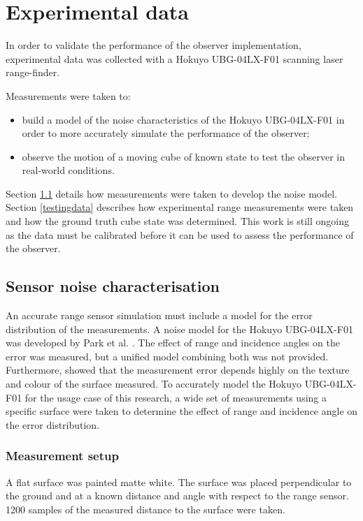 \chapter{Experimental data} \label{chap:experiment}
In order to validate the performance of the observer implementation, experimental data was collected with a Hokuyo UBG-04LX-F01 scanning laser range-finder.

Measurements were taken to:
\begin{itemize}
\item build a model of the noise characteristics of the Hokuyo UBG-04LX-F01 in order to more accurately simulate the performance of the observer;
\item observe the motion of a moving cube of known state to test the observer in real-world conditions.
\end{itemize}

Section \ref{sensor_noise} details how measurements were taken to develop the noise model.
Section \ref{testingdata} describes how experimental range measurements were taken and how the ground truth cube state was determined. This work is still ongoing as the data must be calibrated before it can be used to assess the performance of the observer. 

\section{Sensor noise characterisation} \label{sensor_noise}
An accurate range sensor simulation must include a model for the error distribution of the measurements. A noise model for the Hokuyo UBG-04LX-F01 was developed by Park et al. \cite{park2010characterization}. The effect of range and incidence angles on the error was measured, but a unified model combining both was not provided. Furthermore, \cite{park2010characterization} showed that the measurement error depends highly on the texture and colour of the surface measured. To accurately model the Hokuyo UBG-04LX-F01 for the usage case of this research, a wide set of measurements using a specific surface were taken to determine the effect of range and incidence angle on the error distribution.

	\subsection{Measurement setup}
	A flat surface was painted matte white. The surface was placed perpendicular to the ground and at a known distance and angle with respect to the range sensor.
	1200 samples of the measured distance to the surface were taken.
	
